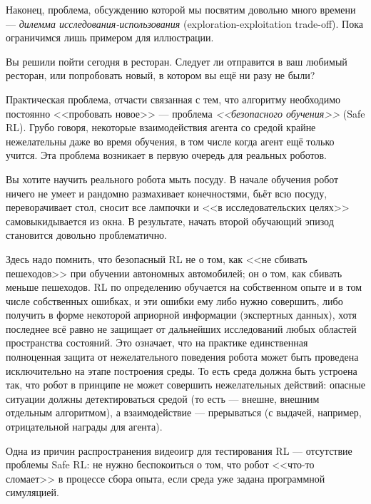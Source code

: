 Наконец, проблема, обсуждению которой мы посвятим довольно много времени --- \emph{дилемма исследования-использования} (exploration-exploitation trade-off). Пока ограничимся лишь примером для иллюстрации.

\begin{example}
Вы решили пойти сегодня в ресторан. Следует ли отправится в ваш любимый ресторан, или попробовать новый, в котором вы ещё ни разу не были?
\end{example}

Практическая проблема, отчасти связанная с тем, что алгоритму необходимо постоянно <<пробовать новое>> --- проблема \emph{<<безопасного обучения>>} (Safe RL). Грубо говоря, некоторые взаимодействия агента со средой крайне нежелательны даже во время обучения, в том числе когда агент ещё только учится. Эта проблема возникает в первую очередь для реальных роботов.

\begin{example}
Вы хотите научить реального робота мыть посуду. В начале обучения робот ничего не умеет и рандомно размахивает конечностями, бьёт всю посуду, переворачивает стол, сносит все лампочки и <<в исследовательских целях>> самовыкидывается из окна. В результате, начать второй обучающий эпизод становится довольно проблематично.
\end{example}

\begin{remark}
Здесь надо помнить, что безопасный RL не о том, как <<не сбивать пешеходов>> при обучении автономных автомобилей; он о том, как сбивать меньше пешеходов. RL по определению обучается на собственном опыте и в том числе собственных ошибках, и эти ошибки ему либо нужно совершить, либо получить в форме некоторой априорной информации (экспертных данных), хотя последнее всё равно не защищает от дальнейших исследований любых областей пространства состояний. Это означает, что на практике единственная полноценная защита от нежелательного поведения робота может быть проведена исключительно на этапе построения среды. То есть среда должна быть устроена так, что робот в принципе не может совершить нежелательных действий: опасные ситуации должны детектироваться средой (то есть --- внешне, внешним отдельным алгоритмом), а взаимодействие --- прерываться (с выдачей, например, отрицательной награды для агента).
\end{remark}

\begin{remark}
Одна из причин распространения видеоигр для тестирования RL --- отсутствие проблемы Safe RL: не нужно беспокоиться о том, что робот <<что-то сломает>> в процессе сбора опыта, если среда уже задана программной симуляцией.
\end{remark}

